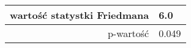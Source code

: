 \begin{tabular}{|r|l|}
  \hline
  wartość statystki Friedmana & 6.0 \\
  \hline
  p-wartość & 0.049 \\
  \hline
\end{tabular}

